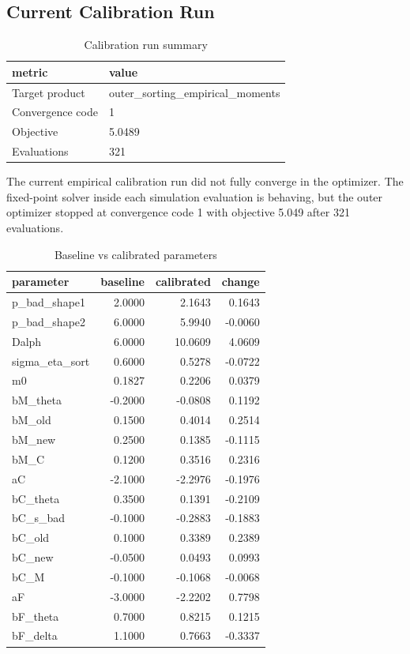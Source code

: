 \documentclass[
  11pt,
]{article}
\begin{document}
\subsection{Current Calibration Run}\label{current-calibration-run}

\begin{table}

\caption{Calibration run summary}
\centering
\begin{tabular}[t]{ll}
\toprule
metric & value\\
\midrule
Target product & outer\_sorting\_empirical\_moments\\
Convergence code & 1\\
Objective & 5.0489\\
Evaluations & 321\\
\bottomrule
\end{tabular}
\end{table}

The current empirical calibration run did not fully converge in the
optimizer. The fixed-point solver inside each simulation evaluation is
behaving, but the outer optimizer stopped at convergence code 1 with
objective 5.049 after 321 evaluations.

\begin{table}

\caption{Baseline vs calibrated parameters}
\centering
\begin{tabular}[t]{lrrr}
\toprule
parameter & baseline & calibrated & change\\
\midrule
p\_bad\_shape1 & 2.0000 & 2.1643 & 0.1643\\
p\_bad\_shape2 & 6.0000 & 5.9940 & -0.0060\\
Dalph & 6.0000 & 10.0609 & 4.0609\\
sigma\_eta\_sort & 0.6000 & 0.5278 & -0.0722\\
m0 & 0.1827 & 0.2206 & 0.0379\\
bM\_theta & -0.2000 & -0.0808 & 0.1192\\
bM\_old & 0.1500 & 0.4014 & 0.2514\\
bM\_new & 0.2500 & 0.1385 & -0.1115\\
bM\_C & 0.1200 & 0.3516 & 0.2316\\
aC & -2.1000 & -2.2976 & -0.1976\\
bC\_theta & 0.3500 & 0.1391 & -0.2109\\
bC\_s\_bad & -0.1000 & -0.2883 & -0.1883\\
bC\_old & 0.1000 & 0.3389 & 0.2389\\
bC\_new & -0.0500 & 0.0493 & 0.0993\\
bC\_M & -0.1000 & -0.1068 & -0.0068\\
aF & -3.0000 & -2.2202 & 0.7798\\
bF\_theta & 0.7000 & 0.8215 & 0.1215\\
bF\_delta & 1.1000 & 0.7663 & -0.3337\\
\bottomrule
\end{tabular}
\end{table}
\end{document}
